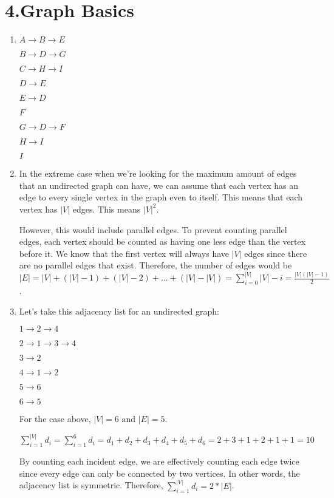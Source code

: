\documentclass[11pt]{article}
\newenvironment{qparts}{\begin{enumerate}[{(}a{)}]}{\end{enumerate}}
\begin{document}
\newpage
\section*{4.Graph Basics}
\begin{qparts}
\item

$A \rightarrow B \rightarrow E$

$B \rightarrow D \rightarrow G$

$C \rightarrow H \rightarrow I$

$D \rightarrow E$ 

$E \rightarrow D$ 

$F$

$G \rightarrow D \rightarrow F$

$H \rightarrow I$

$I$

\item

In the extreme case when we're looking for the maximum amount of edges that an undirected graph can have, we can assume that each vertex has an edge to every single vertex in the graph even to itself. This means that each vertex has $|V|$ edges. This means $|V|^2$.

However, this would include parallel edges. To prevent counting parallel edges, each vertex should be counted as having one less edge than the vertex before it. We know that the first vertex will always have $|V|$ edges since there are no parallel edges that exist. Therefore, the number of edges would be $|E| = |V|+(|V|-1) + (|V| - 2) + ... + (|V| - |V|) = \sum_{i = 0}^{|V|}|V|-i = \frac{|V|(|V| - 1)}{2}$. 

\item

Let's take this adjacency list for an undirected graph:

$1 \rightarrow 2 \rightarrow 4$

$2 \rightarrow 1 \rightarrow 3 \rightarrow 4$

$3 \rightarrow 2$

$4 \rightarrow 1 \rightarrow 2$

$5 \rightarrow 6$

$6 \rightarrow 5$

For the case above, $|V| = 6$ and $|E| = 5$. 

$\sum_{i = 1}^{|V|}d_{i} = \sum_{i = 1}^{6}d_{i} = d_{1} + d_{2} + d_{3} + d_{4} + d_{5} + d_{6} = 2 + 3 + 1 + 2 + 1 + 1 = 10$

By counting each incident edge, we are effectively counting each edge twice since every edge can only be connected by two vertices. In other words, the adjacency list is symmetric. Therefore, $\sum_{i = 1}^{|V|}d_{i} = 2 * |E|$. 


\end{qparts}
\end{document}
